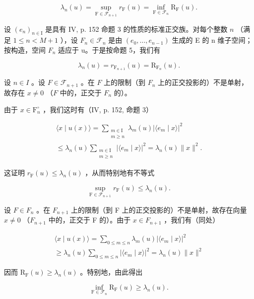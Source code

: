 \[
\lambda_ {n} (u) = \sup _ {\mathrm{F} \in \mathscr {F} _ {n + 1}} r _ {\mathrm{F}} (u) = \inf _ {\mathrm{F} \in \mathscr {F} _ {n}} \mathrm{R} _ {\mathrm{F}} (u).
\]

设 \((e_{n})_{n\in\mathrm{I}}\) 是具有 IV, p. 152 命题 3 的性质的标准正交族。对每个整数 \(n\) （满足 \(1\leqslant n<M+1\) ），设 \(F_{n}\in\mathcal{F}_{n}\) 是由 \((e_{0},\ldots,e_{n-1})\) 生成的 E 的 n 维子空间；按构造，空间 \(F_{n}\) 适应于 u。于是按命题 5，我们有

\[
\lambda_ {n} (u) = r _ {\mathrm{F} _ {n + 1}} (u) = \mathrm{R} _ {\mathrm{F} _ {n}} (u).\tag{2}
\]

设 \(n \in I\) 。设 \(F \in \mathcal{F}_{n+1}\) 。在 \(F\) 上的限制（到 \(F_n\) 上的正交投影的）不是单射，故存在 \(x \neq 0\) （\(F\) 中的，正交于 \(F_n\) 的）。

由于 \(x \in \mathrm{F}_{n}^{\circ}\) ，我们这时有（IV, p. 152, 命题 3）

\[
\begin{array}{l}\langle x\mid u(x)\rangle = \sum_{\substack{m\in \mathrm{I}\\ m\geqslant n}}\lambda_{m}(u)|\langle e_{m}\mid x\rangle |^{2}\\ \leqslant \lambda_{n}(u)\sum_{\substack{m\in \mathrm{I}\\ m\geqslant n}}|\langle e_{m}\mid x\rangle |^{2} = \lambda_{n}(u)\| x\|^{2}. \end{array}
\]

这证明 \(r_{\mathrm{F}}(u)\leqslant\lambda_{n}(u)\) ，从而特别地有不等式

\[
\sup _ {\mathrm{F} \in \mathscr {F} _ {n + 1}} r _ {\mathrm{F}} (u) \leqslant \lambda_ {n} (u).\tag{3}
\]

设 \(F \in F_{n}\) 。在 \(F_{n+1}\) 上的限制（到 F 上的正交投影的）不是单射，故存在向量 \(x \neq 0\) （\(F_{n+1}\) 中的，正交于 F 的）。由于 \(x \in F_{n+1}\) ，我们有（同处）

\[
\begin{array}{c} \langle x \mid u (x) \rangle = \sum_ {0 \leqslant m \leqslant n} \lambda_ {m} (u) | \langle e _ {m} \mid x \rangle | ^ {2} \\ \geqslant \lambda_ {n} (u) \sum_ {0 \leqslant m \leqslant n} | \langle e _ {m} \mid x \rangle | ^ {2} = \lambda_ {n} (u) \| x \| ^ {2} \end{array}
\]

因而 \(\mathrm{R_F}(u) \geqslant \lambda_n(u)\) 。特别地，由此得出

\[
\inf _ {\mathrm{F} \in \mathcal {F} _ {n}} \mathrm{R} _ {\mathrm{F}} (u) \geqslant \lambda_ {n} (u).\tag{4}
\]


